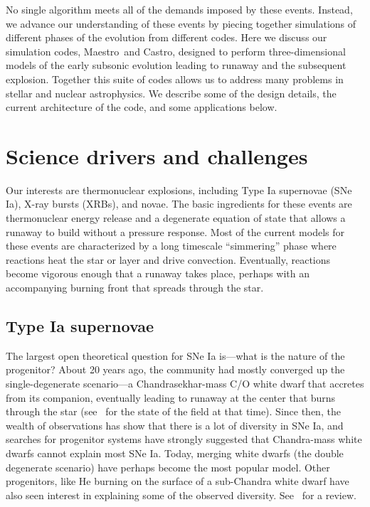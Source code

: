 \documentclass[a4paper]{jpconf}
\newcommand{\maestro}{{\sffamily Maestro}}
\newcommand{\castro}{{\sffamily Castro}}
\begin{document}
No single algorithm meets all of the demands imposed by these events.
Instead, we advance our understanding of these events by piecing
together simulations of different phases of the evolution from
different codes.  Here we discuss our simulation codes, \maestro\ and
\castro, designed to perform three-dimensional models of the early
subsonic evolution leading to runaway and the subsequent explosion.
Together this suite of codes allows us to address many problems in
stellar and nuclear astrophysics.  We describe some of the design
details, the current architecture of the code, and some applications
below.

\section{Science drivers and challenges}

Our interests are thermonuclear explosions, including Type Ia
supernovae (SNe Ia), X-ray bursts (XRBs), and novae.  The basic
ingredients for these events are thermonuclear energy release and a
degenerate equation of state that allows a runaway to build without a
pressure response.  Most of the current models for these events are
characterized by a long timescale ``simmering'' phase where reactions
heat the star or layer and drive convection.  Eventually, reactions
become vigorous enough that a runaway takes place, perhaps with an
accompanying burning front that spreads through the star.

\subsection{Type Ia supernovae}

The largest open theoretical question for SNe Ia is---what is the
nature of the progenitor?  About 20 years ago, the community had
mostly converged up the single-degenerate scenario---a
Chandrasekhar-mass C/O white dwarf that accretes from its companion,
eventually leading to runaway at the center that burns through the
star (see~\cite{hillebrandtniemeyer2000} for the state of the field at
that time).  Since then, the wealth of observations has show that
there is a lot of diversity in SNe Ia, and searches for progenitor
systems have strongly suggested that Chandra-mass white dwarfs cannot
explain most SNe Ia.  Today, merging white dwarfs (the double
degenerate scenario) have perhaps become the most popular model.
Other progenitors, like He burning on the surface of a sub-Chandra
white dwarf have also seen interest in explaining some of the observed
diversity.  See~\cite{araa-maoz} for a review.
\end{document}

